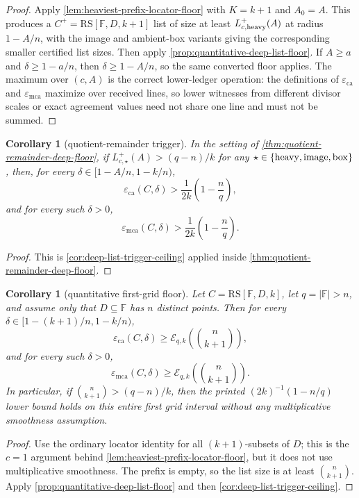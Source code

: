 \documentclass[11pt]{article}
\newtheorem{corollary}[theorem]{Corollary}
\theoremstyle{definition}
\theoremstyle{remark}
\newcommand{\F}{\mathbb{F}}
\newcommand{\RS}{\mathrm{RS}}
\newcommand{\eca}{\varepsilon_{\mathrm{ca}}}
\newcommand{\emca}{\varepsilon_{\mathrm{mca}}}
\begin{document}
\begin{proof}
Apply \cref{lem:heaviest-prefix-locator-floor} with $K=k+1$ and $A_0=A$.  This
produces a $C^+=\RS[\F,D,k+1]$ list of size at least
$L_{c,{\rm heavy}}^+(A)$ at radius $1-A/n$, with the image and ambient-box
variants giving the corresponding smaller certified list sizes.  Then apply
\cref{prop:quantitative-deep-list-floor}.  If $A\ge a$ and
$\delta\ge1-a/n$, then $\delta\ge1-A/n$, so the same converted floor applies.
The maximum over $(c,A)$ is the correct lower-ledger operation: the definitions
of $\eca$ and $\emca$ maximize over received lines, so lower witnesses from
different divisor scales or exact agreement values need not share one line and
must not be summed.
\end{proof}

\begin{corollary}[quotient-remainder trigger]
\label{cor:quotient-remainder-trigger}
In the setting of \cref{thm:quotient-remainder-deep-floor}, if
$L_{c,\star}^+(A)>(q-n)/k$ for any
$\star\in\{{\rm heavy},{\rm image},{\rm box}\}$, then, for every
$\delta\in[1-A/n,1-k/n)$,
\[
        \eca(C,\delta)>
        \frac1{2k}\left(1-\frac nq\right),
\]
and for every such $\delta>0$,
\[
        \emca(C,\delta)>
        \frac1{2k}\left(1-\frac nq\right).
\]
\end{corollary}

\begin{proof}
This is \cref{cor:deep-list-trigger-ceiling} applied inside
\cref{thm:quotient-remainder-deep-floor}.
\end{proof}

\begin{corollary}[quantitative first-grid floor]
\label{cor:quantitative-first-grid-floor}
Let $C=\RS[\F,D,k]$, let $q=|\F|>n$, and assume only that $D\subseteq\F$ has
$n$ distinct points.  Then for every
$\delta\in[1-(k+1)/n,1-k/n)$,
\[
        \eca(C,\delta)
        \ge
        \mathcal E_{q,k}\left(\binom n{k+1}\right),
\]
and for every such $\delta>0$,
\[
        \emca(C,\delta)
        \ge
        \mathcal E_{q,k}\left(\binom n{k+1}\right).
\]
In particular, if $\binom n{k+1}>(q-n)/k$, then the printed
$(2k)^{-1}(1-n/q)$ lower bound holds on this entire first grid interval without
any multiplicative smoothness assumption.
\end{corollary}

\begin{proof}
Use the ordinary locator identity for all $(k+1)$-subsets of $D$; this is the
$c=1$ argument behind \cref{lem:heaviest-prefix-locator-floor}, but it does not
use multiplicative smoothness.  The prefix is empty, so the list size is at
least
$\binom n{k+1}$.  Apply \cref{prop:quantitative-deep-list-floor} and then
\cref{cor:deep-list-trigger-ceiling}.
\end{proof}
\end{document}
